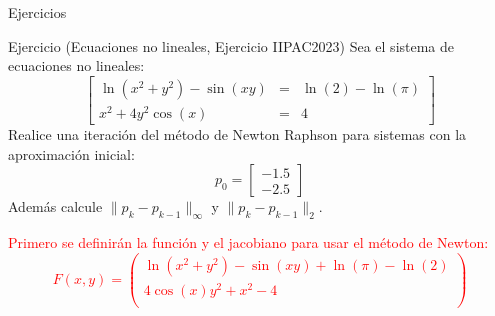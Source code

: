 \begin{frame}[fragile]{Ejercicios}
\label{EjercicioNewtonSistemas}
\begin{block}{Ejercicio (Ecuaciones no lineales, Ejercicio IIPAC2023)}
Sea el sistema de ecuaciones no lineales:
\begin{displaymath}
\begin{bmatrix}
\ln(x^2+y^2)-\sin(xy) &=& \ln(2)-\ln(\pi)\\
x^2+4y^2\cos(x) &=&4
\end{bmatrix}
\end{displaymath}
Realice una iteración del método de Newton Raphson para sistemas con la aproximación inicial:
\begin{displaymath}
p_0=\begin{bmatrix}
-1.5\\
-2.5
\end{bmatrix}
\end{displaymath}
Además calcule $\parallel p_k-p_{k-1}\parallel_{\infty}$ y $\parallel p_k-p_{k-1}\parallel_2$.
\end{block}\pause
\textcolor{red}{
Primero se definirán la función y el jacobiano para usar el método de Newton:
\small
\begin{displaymath}
F(x,y)=\begin{pmatrix}
\ln(x^2+y^2)-\sin(xy)+\ln(\pi)-\ln(2)\\
4\cos(x)y^2+x^2-4\\
\end{pmatrix}
\end{displaymath}
}
\end{frame}
